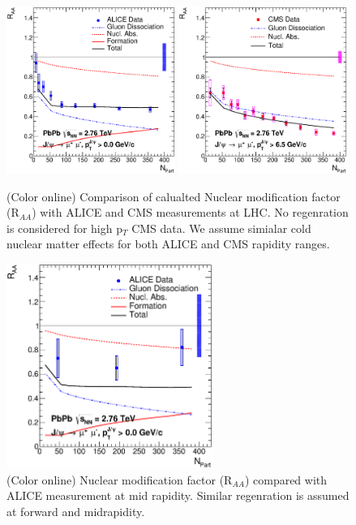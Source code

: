 \documentclass[aps,prc,preprint,superscriptaddress,showpacs,showkeys]{revtex4-1}
\begin{document}
\begin{figure}
\includegraphics[width=0.49\textwidth]{Fig4a_ALICE_RAA.eps}
\includegraphics[width=0.49\textwidth]{Fig4b_CMS_RAA_JPsi.eps}
\caption{(Color online) Comparison of calualted Nuclear modification factor (R$_{AA}$) with ALICE and CMS measurements at LHC. No regenration is 
considered for high p$_{T}$ CMS data. We assume simialar cold nuclear matter effects for both ALICE and CMS rapidity ranges.}
\label{fig:JPsiRaa}
\end{figure}

\begin{figure}
\includegraphics[width=0.60\textwidth]{Fig5_ALICEMid_RAA.eps}
\caption{(Color online) Nuclear modification factor (R$_{AA}$) compared with ALICE measurement at mid
rapidity. Similar regenration is assumed at forward and midrapidity.}
\label{fig:JPsiRaaALICEMid}
\end{figure}
\end{document}
